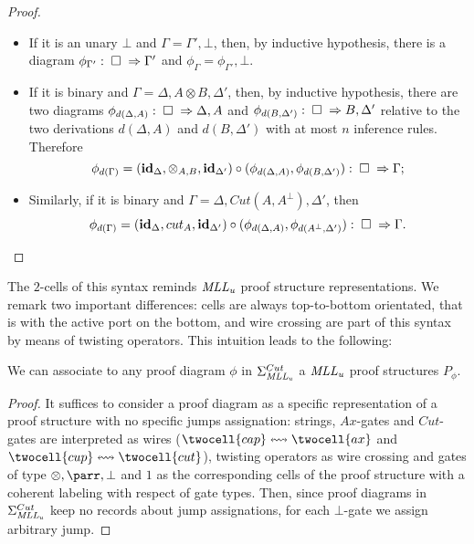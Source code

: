 \documentclass[a4paper]{article}
\begin{document}
\begin{theorem}
\begin{proof}
\begin{itemize}
\begin{itemize}
\item If it  is an unary $\bot$ and $\Gamma= \Gamma', \bot$, then, by inductive  hypothesis, there is a  diagram $\phi_{\Gamma'}: \; \square \; \Rightarrow \Gamma'$ and $\phi_\Gamma= \phi_{\Gamma'}, \bot$.


\item If it is binary and $ \Gamma=\Delta, A\otimes B, \Delta'$, then, by inductive hypothesis, there are two diagrams $\phi_{d(\Delta, A)}:\; \square \; \Rightarrow \Delta, A$ and $\phi_{d(B, \Delta')}:\; \square \; \Rightarrow B ,\Delta'$ relative to the two derivations $d(\Delta, A)$ and $d(B, \Delta')$ with at most $n$ inference rules. Therefore
$$\phi_{d(\Gamma)}=(\textbf{id}_{\Delta},\otimes_{A,B}, \textbf{id}_{\Delta'}) \circ (\phi_{d(\Delta, A)} , \phi_{d(B, \Delta')}):  \; \square \; \Rightarrow \Gamma ;$$

\item Similarly, if it is binary and $\Gamma= \Delta, Cut(A, A^\bot), \Delta'$, then
$$\phi_{d(\Gamma)}=(\textbf{id}_{\Delta},cut_{A}, \textbf{id}_{\Delta'}) \circ (\phi_{d(\Delta, A)} , \phi_{d(A^\bot, \Delta')}):  \; \square \; \Rightarrow \Gamma . $$
\end{itemize}
\end{itemize}
\end{proof}
\end{theorem}




The $2$-cells of this syntax reminds $\mathit{MLL_u}$ proof structure representations. We remark two important differences: cells are always top-to-bottom orientated, that is with the active port on the bottom, and wire crossing are part of this syntax by means of twisting operators.  
This intuition leads to the following:

\begin{proposition}\label{psint}
We can associate to any proof diagram $\phi$ in $\Sigma_{\mathit{MLL_u}}^{Cut}$ a $\mathit{MLL_u}$ proof structures $P_\phi$. 
\begin{proof}
It suffices to consider a proof diagram as a specific representation of a proof structure with no specific jumps assignation: strings, $Ax$-gates and $Cut$-gates are interpreted as wires ($\twocell{cap}\leftrightsquigarrow \twocell{ax}$ and $\twocell{cup}\leftrightsquigarrow \twocell{cut}$),  twisting operators as wire crossing and  gates of type $\otimes, \parr, \bot$ and $1$ as the corresponding cells of the proof structure with a  coherent  labeling with respect of gate types. Then, since proof diagrams in $\Sigma_{\mathit{MLL_u}}^{Cut}$ keep no records about jump assignations, for each $\bot$-gate we assign arbitrary  jump.
\end{proof}
\end{proposition}
\end{document}
